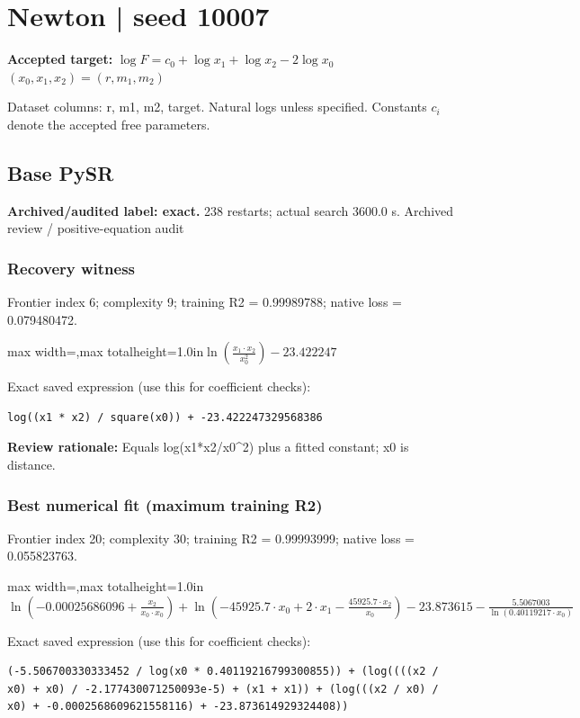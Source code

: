 \documentclass[10pt,letterpaper,landscape]{article}
\begin{document}
\section*{Newton | seed 10007}
\textbf{Accepted target:} $\displaystyle \log F=c_0+\log x_1+\log x_2-2\log x_0$\hfill $(x_0,x_1,x_2)=(r,m_1,m_2)$\par
{\small Dataset columns: r, m1, m2, target. Natural logs unless specified. Constants $c_i$ denote the accepted free parameters.}\par\medskip
\begin{minipage}[t]{0.485\textwidth}
\subsection*{Base PySR}
\textbf{Archived/audited label: exact.} 238 restarts; actual search 3600.0 s.
{\small Archived review / positive-equation audit}
\subsubsection*{Recovery witness}
Frontier index 6; complexity 9; training R2 = 0.99989788; native loss = 0.079480472.
\begin{center}\begin{adjustbox}{max width=\linewidth,max totalheight=1.0in}$\displaystyle \ln{\left(\frac{x_{1} \cdot x_{2}}{x_{0}^{2}} \right)} - 23.422247$\end{adjustbox}\end{center}
{\scriptsize Exact saved expression (use this for coefficient checks):}
\begin{lstlisting}
log((x1 * x2) / square(x0)) + -23.422247329568386
\end{lstlisting}
{\small\textbf{Review rationale:} Equals log(x1*x2/x0\textasciicircum{}2) plus a fitted constant; x0 is distance.}
\subsubsection*{Best numerical fit (maximum training R2)}
Frontier index 20; complexity 30; training R2 = 0.99993999; native loss = 0.055823763.
\begin{center}\begin{adjustbox}{max width=\linewidth,max totalheight=1.0in}$\displaystyle \ln{\left(-0.00025686096 + \frac{x_{2}}{x_{0} \cdot x_{0}} \right)} + \ln{\left(- 45925.7 \cdot x_{0} + 2 \cdot x_{1} - \frac{45925.7 \cdot x_{2}}{x_{0}} \right)} - 23.873615 - \frac{5.5067003}{\ln{\left(0.40119217 \cdot x_{0} \right)}}$\end{adjustbox}\end{center}
{\scriptsize Exact saved expression (use this for coefficient checks):}
\begin{lstlisting}
(-5.506700330333452 / log(x0 * 0.40119216799300855)) + (log((((x2 / x0) + x0) / -2.177430071250093e-5) + (x1 + x1)) + (log(((x2 / x0) / x0) + -0.0002568609621558116) + -23.873614929324408))
\end{lstlisting}
\end{minipage}\hfill
\end{document}
